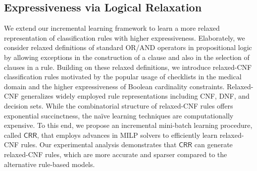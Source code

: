 \subsection*{Expressiveness via Logical Relaxation}
We extend our incremental learning framework to learn a more relaxed representation of classification rules with higher expressiveness. Elaborately, we consider relaxed definitions of standard OR/AND operators in propositional logic by allowing exceptions in the construction of a clause and also in the selection of clauses in a rule. Building on these relaxed definitions, we introduce relaxed-CNF classification rules motivated by the popular usage of checklists in the medical domain and the higher expressiveness of Boolean cardinality constraints. Relaxed-CNF generalizes widely employed rule representations including CNF, DNF, and decision sets. While the combinatorial structure of relaxed-CNF rules offers exponential succinctness, the na\"ive learning techniques are computationally expensive. To this end, we propose an incremental mini-batch learning procedure, called $ \mathsf{CRR} $, that employs advances in MILP solvers to efficiently learn relaxed-CNF rules. Our experimental analysis demonstrates that $ \mathsf{CRR} $ can generate relaxed-CNF rules, which are more accurate and sparser compared to the alternative rule-based models.







